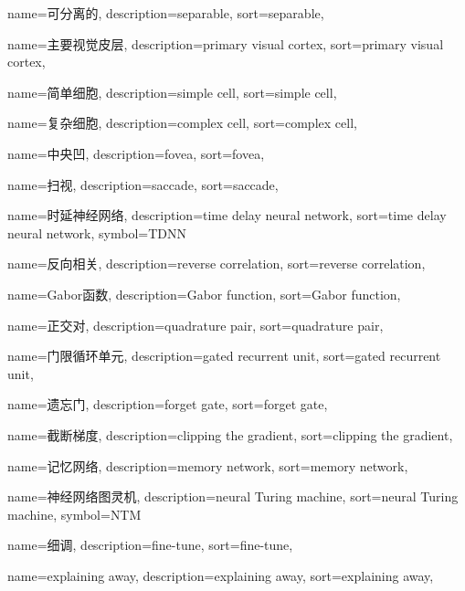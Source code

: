 {
  name=可分离的,
  description={separable},
  sort={separable},
}

{
  name=主要视觉皮层,
  description={primary visual cortex},
  sort={primary visual cortex},
}

{
  name=简单细胞,
  description={simple cell},
  sort={simple cell},
}

{
  name=复杂细胞,
  description={complex cell},
  sort={complex cell},
}

{
  name=中央凹,
  description={fovea},
  sort={fovea},
}

{
  name=扫视,
  description={saccade},
  sort={saccade},
}

{
  name=时延神经网络,
  description={time delay neural network},
  sort={time delay neural network},
  symbol={TDNN}
}

{
  name=反向相关,
  description={reverse correlation},
  sort={reverse correlation},
}

{
  name=Gabor函数,
  description={Gabor function},
  sort={Gabor function},
}

{
  name=正交对,
  description={quadrature pair},
  sort={quadrature pair},
}

{
  name=门限循环单元,
  description={gated recurrent unit},
  sort={gated recurrent unit},
}

{
  name=遗忘门,
  description={forget gate},
  sort={forget gate},
}

{
  name=截断梯度,
  description={clipping the gradient},
  sort={clipping the gradient},
}

{
  name=记忆网络,
  description={memory network},
  sort={memory network},
}

{
  name=神经网络图灵机,
  description={neural Turing machine},
  sort={neural Turing machine},
  symbol={NTM}
}

{
  name=细调,
  description={fine-tune},
  sort={fine-tune},
}

{
  name=explaining away,
  description={explaining away},
  sort={explaining away},
}


